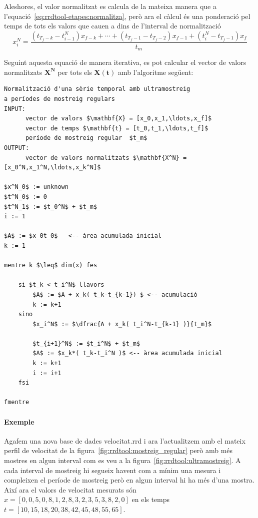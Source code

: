 Aleshores, el valor normalitzat es calcula de la mateixa manera que a l'equació~\ref{eq:rrdtool-etapes:normalitza}, però ara el càlcul és una ponderació pel temps de tots els valors que cauen a dins de l'interval de normalització
\begin{equation}\label{eq:rrdtool:ultramostreig}
x^N_i = \frac{ (t_{T_f-k}-t^N_{i-1})x_{f-k} + \cdots + (t_{T_f-1}-t_{T_f-2})x_{f-1} + (t^N_i-t_{T_f-1})x_f }{t_m}
\end{equation}


Seguint aquesta equació de manera iterativa, es pot calcular el vector de valors normalitzats $\mathbf{X^N}$  per tots els $\mathbf{X(t)}$ amb l'algoritme següent:

\begin{lstlisting}[mathescape=true]  
Normalització d'una sèrie temporal amb ultramostreig 
a períodes de mostreig regulars 
INPUT: 
      vector de valors $\mathbf{X} = [x_0,x_1,\ldots,x_f]$ 
      vector de temps $\mathbf{t} = [t_0,t_1,\ldots,t_f]$
      període de mostreig regular  $t_m$
OUTPUT: 
      vector de valors normalitzats $\mathbf{X^N} = [x_0^N,x_1^N,\ldots,x_k^N]$

$x^N_0$ := unknown
$t^N_0$ := 0
$t^N_1$ := $t_0^N$ + $t_m$
i := 1

$A$ := $x_0t_0$   <-- àrea acumulada inicial 
k := 1

mentre k $\leq$ dim(x) fes

    si $t_k < t_i^N$ llavors
        $A$ := $A + x_k( t_k-t_{k-1}) $ <-- acumulació
        k := k+1
    sino 
        $x_i^N$ := $\dfrac{A + x_k( t_i^N-t_{k-1} )}{t_m}$

        $t_{i+1}^N$ := $t_i^N$ + $t_m$
        $A$ := $x_k*( t_k-t_i^N )$ <-- àrea acumulada inicial 
        k := k+1
        i := i+1
    fsi 

fmentre

\end{lstlisting}

\paragraph{Exemple}

Agafem una nova base de dades velocitat.rrd i ara l'actualitzem amb el mateix perfil de velocitat de la figura~\ref{fig:rrdtool:mostreig_regular} però amb més mostres en algun interval com es veu a la figura~\ref{fig:rrdtool:ultramostreig}. A cada interval de mostreig hi segueix havent com a mínim una mesura i compleixen el període de mostreig però en algun interval hi ha més d'una mostra. Així ara el valors de velocitat mesurats són $x=[0 , 0{,}5 , 0{,}8 , 1 , 2{,}8 , 3{,}2 , 3{,}5 , 3{,}8 , 2 , 0]$ en els temps $t=[10 , 15 , 18, 20, 38, 42, 45, 48, 55, 65]$.


